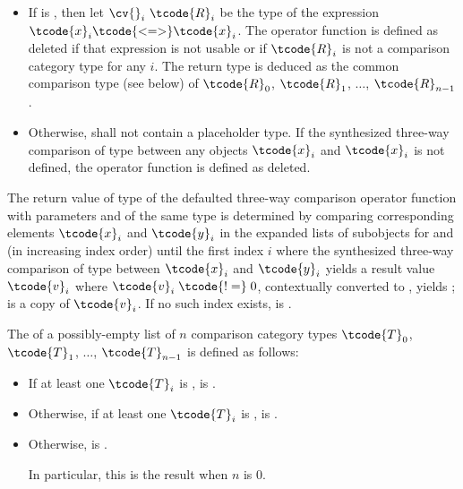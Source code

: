 \begin{itemize}
\item
If  is , then
let $\cv{}_i~\tcode{R}_i$ be
the type of the expression $\tcode{x}_i\tcode{ <=> }\tcode{x}_i$.
The operator function is defined as deleted
if that expression is not usable or
if $\tcode{R}_i$ is not
a comparison category type for any $i$.
The return type is deduced as
the common comparison type (see below) of
$\tcode{R}_0$, $\tcode{R}_1$, $\dotsc$, $\tcode{R}_{n-1}$.
\item
Otherwise,  shall not contain a placeholder type.
If the synthesized three-way comparison of type 
between any objects $\tcode{x}_i$ and $\tcode{x}_i$
is not defined,
the operator function is defined as deleted.
\end{itemize}

\pnum
The return value  of type 
of the defaulted three-way comparison operator function
with parameters  and  of the same type
is determined by comparing corresponding elements
$\tcode{x}_i$ and $\tcode{y}_i$
in the expanded lists of subobjects for  and 
(in increasing index order)
until the first index $i$ where
the synthesized three-way comparison of type 
between $\tcode{x}_i$ and $\tcode{y}_i$
yields a result value $\tcode{v}_i$ where $\tcode{v}_i \mathrel{\tcode{!=}} 0$,
contextually converted to , yields ;
 is a copy of $\tcode{v}_i$.
If no such index exists,  is
.

\pnum
The  
of a possibly-empty list of $n$ comparison category types
$\tcode{T}_0$, $\tcode{T}_1$, $\dotsc$, $\tcode{T}_{n-1}$
is defined as follows:
\begin{itemize}
\item
If at least one $\tcode{T}_i$ is ,
 is .

\item
Otherwise, if at least one $\tcode{T}_i$ is ,
 is .

\item
Otherwise,  is .
\begin{note}
In particular, this is the result when $n$ is 0.
\end{note}
\end{itemize}

